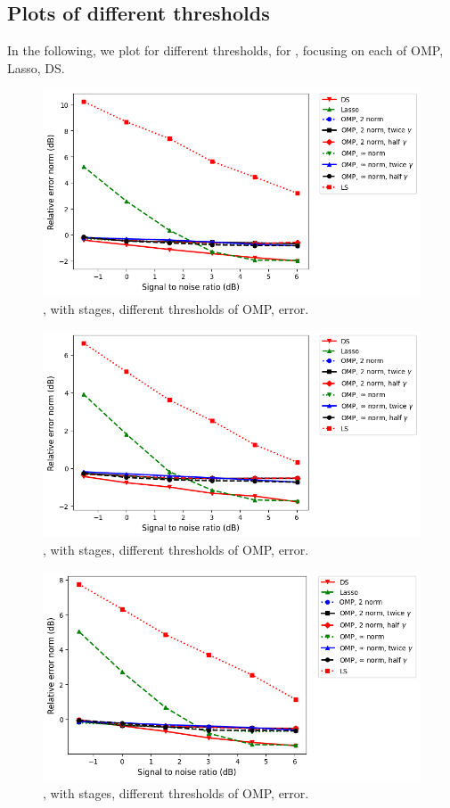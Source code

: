 \subsection {Plots of different thresholds}

In the following, we plot for different thresholds, for , focusing on each of OMP, Lasso, DS.
%
\begin {figure} [H]
\includegraphics [width = 0.8 \textwidth] {error-medium-more-square-six-oommpp.png}
\caption {, with  stages, different thresholds of OMP, error.}
\end {figure}
%
\begin {figure} [H]
\includegraphics [width = 0.8 \textwidth] {error-medium-more-wide-six-oommpp.png}
\caption {, with  stages, different thresholds of OMP, error.}
\end {figure}
%
\begin {figure} [H]
\includegraphics [width = 0.8 \textwidth] {error-medium-more-tall-six-oommpp.png}
\caption {, with  stages, different thresholds of OMP, error.}
\end {figure}
